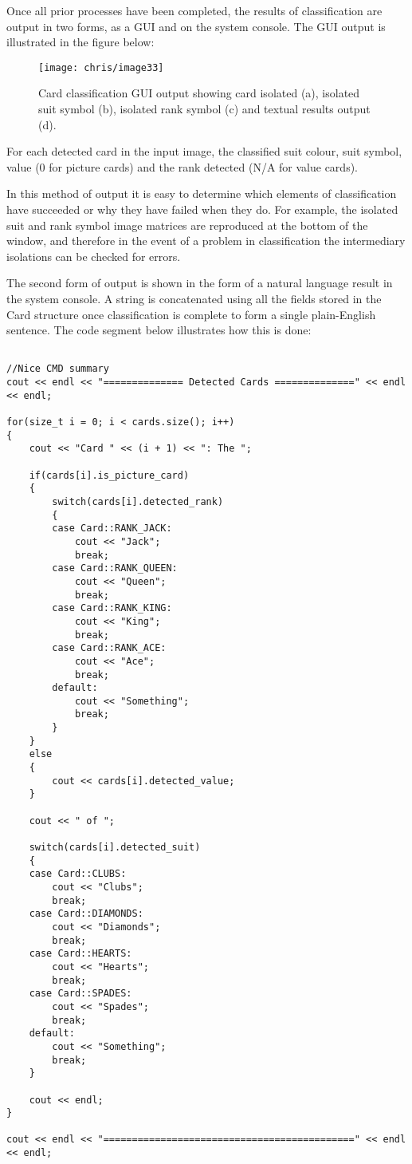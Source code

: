		Once all prior processes have been completed, the results of classification are output in two forms, as a GUI and on the system console. The GUI output is illustrated in the figure below:
		
		\begin{figure}[H]
			\centering
			\texttt{[image: chris/image33]}
			\caption{Card classification GUI output showing card isolated (a), isolated suit symbol (b), isolated rank symbol (c) and textual results output (d).}
		\end{figure}

		For each detected card in the input image, the classified suit colour, suit symbol, value (0 for picture cards) and the rank detected (N/A for value cards).
		
		In this method of output it is easy to determine which elements of classification have succeeded or why they have failed when they do. For example, the isolated suit and rank symbol image matrices are reproduced at the bottom of the window, and therefore in the event of a problem in classification the intermediary isolations can be checked for errors. 
		
		The second form of output is shown in the form of a natural language result in the system console. A string is concatenated using all the fields stored in the Card structure once classification is complete to form a single plain-English sentence. The code segment below illustrates how this is done:

		\begin{lstlisting}

//Nice CMD summary
cout << endl << "============== Detected Cards ==============" << endl << endl;

for(size_t i = 0; i < cards.size(); i++)
{
    cout << "Card " << (i + 1) << ": The ";

    if(cards[i].is_picture_card)
    {
        switch(cards[i].detected_rank)
        {
        case Card::RANK_JACK:
            cout << "Jack";
            break;
        case Card::RANK_QUEEN:
            cout << "Queen";
            break;
        case Card::RANK_KING:
            cout << "King";
            break;
        case Card::RANK_ACE:
            cout << "Ace";
            break;
        default:
            cout << "Something";
            break;
        }
    }
    else
    {
        cout << cards[i].detected_value;
    }

    cout << " of ";

    switch(cards[i].detected_suit)
    {
    case Card::CLUBS:
        cout << "Clubs";
        break;
    case Card::DIAMONDS:
        cout << "Diamonds";
        break;
    case Card::HEARTS:
        cout << "Hearts";
        break;
    case Card::SPADES:
        cout << "Spades";
        break;
    default:
        cout << "Something";
        break;
    }

    cout << endl;
}

cout << endl << "============================================" << endl << endl;
		\end{lstlisting}

